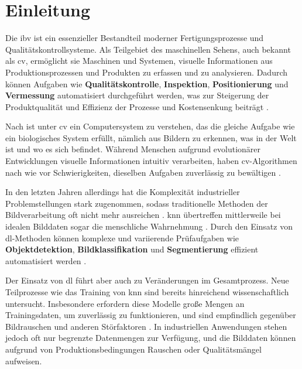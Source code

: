 \chapter{Einleitung}\label{sec:exp_einleitung}

Die \gls{ibv} ist ein essenzieller Bestandteil moderner Fertigungsprozesse und Qualitätskontrollsysteme. Als Teilgebiet des maschinellen Sehens, auch bekannt als \gls{cv}, ermöglicht sie Maschinen und Systemen, visuelle Informationen aus Produktionsprozessen und Produkten zu erfassen und zu analysieren. Dadurch können Aufgaben wie \textbf{Qualitätskontrolle}, \textbf{Inspektion}, \textbf{Positionierung} und \textbf{Vermessung} automatisiert durchgeführt werden, was zur Steigerung der Produktqualität und Effizienz der Prozesse und Kostensenkung beiträgt \citep{cognex_grundlagen_nodate}.

Nach \citep{jahne_digitale_2024} ist unter \gls{cv} ein Computersystem zu verstehen, das die gleiche Aufgabe wie ein biologisches System erfüllt, nämlich aus Bildern zu erkennen, was in der Welt ist und wo es sich befindet. Während Menschen aufgrund evolutionärer Entwicklungen visuelle Informationen intuitiv verarbeiten, haben \gls{cv}-Algorithmen nach wie vor Schwierigkeiten, dieselben Aufgaben zuverlässig zu bewältigen \citep[S.~3]{szeliski_computer_2022}. 

In den letzten Jahren allerdings hat die Komplexität industrieller Problemstellungen stark zugenommen, sodass traditionelle Methoden der Bildverarbeitung oft nicht mehr ausreichen \citep[S.~442]{suse_bildverarbeitung_2014}. \gls{knn} übertreffen mittlerweile bei idealen Bilddaten sogar die menschliche Wahrnehmung \citep{dodge_study_2017}. Durch den Einsatz von \gls{dl}-Methoden können komplexe und variierende Prüfaufgaben wie \textbf{Objektdetektion}, \textbf{Bildklassifikation} und \textbf{Segmentierung} effizient automatisiert werden \citep{kaur_systematic_2024, manakitsa_review_2024}.

Der Einsatz von \gls{dl} führt aber auch zu Veränderungen im Gesamtprozess. Neue Teilprozesse wie das Training von \gls{knn} sind bereits hinreichend wissenschaftlich untersucht. Insbesondere erfordern diese Modelle große Mengen an Trainingsdaten, um zuverlässig zu funktionieren, und sind empfindlich gegenüber Bildrauschen und anderen Störfaktoren \citep{dodge_study_2017}. In industriellen Anwendungen stehen jedoch oft nur begrenzte Datenmengen zur Verfügung, und die Bilddaten können aufgrund von Produktionsbedingungen Rauschen oder Qualitätsmängel aufweisen.

